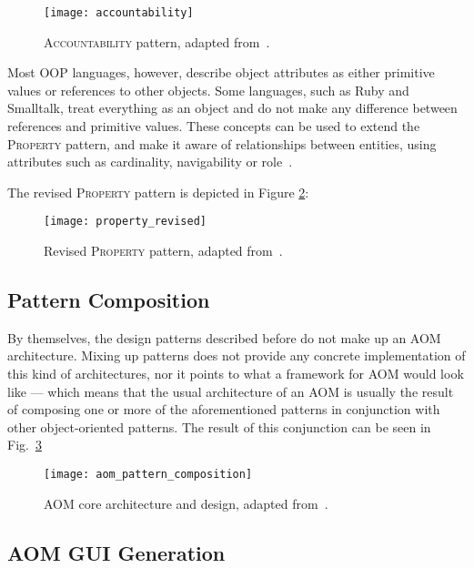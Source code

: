 \begin{figure}[H]
  \centering
  \texttt{[image: accountability]}
  \caption[\textsc{Accountability} pattern]{\textsc{Accountability} pattern, adapted from~\cite{fowler_accountability}.}
  \label{fig:accountability}
\end{figure}

Most OOP languages, however, describe object attributes as either primitive values or references to other objects. Some languages, such as Ruby and Smalltalk, treat everything as an object and do not make any difference between references and primitive values. These concepts can be used to extend the \textsc{Property} pattern, and make it aware of relationships between entities, using attributes such as cardinality, navigability or role~\cite{aom_research_roadmap}.

The revised \textsc{Property} pattern is depicted in Figure \ref{fig:property_revised}:

\begin{figure}[H]
  \centering
  \texttt{[image: property\_revised]}
  \caption[Revised \textsc{Property} pattern]{Revised \textsc{Property} pattern, adapted from~\cite{aom_research_roadmap}.}
  \label{fig:property_revised}
\end{figure}

\subsection{Pattern Composition}\label{sec:aom_pattern_composition}

By themselves, the design patterns described before do not make up an AOM architecture. Mixing up patterns does not provide any concrete implementation of this kind of architectures, nor it points to what a framework for AOM would look like --- which means that the usual architecture of an AOM is usually the result of composing one or more of the aforementioned patterns in conjunction with other object-oriented patterns. The result of this conjunction can be seen in Fig.~\ref{fig:aom_pattern_composition}

\begin{figure}[H]
  \centering
  \texttt{[image: aom\_pattern\_composition]}
  \caption[AOM core architecture and design]{AOM core architecture and design, adapted from~\cite{YBJ01}.}
  \label{fig:aom_pattern_composition}
\end{figure}

\subsection{AOM GUI Generation}\label{sec:aom_gui_generation}

